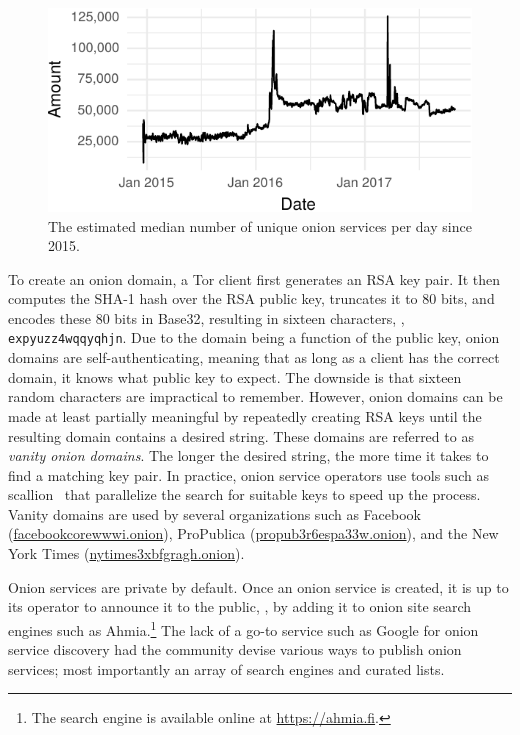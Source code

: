 \begin{figure}[ht]
\includegraphics[width=\linewidth]{figures/os-growth.pdf}
\caption{The estimated median number of unique onion services per day since
2015.}
\label{fig:os-growth}
\end{figure}

To create an onion domain, a Tor client first generates an RSA key pair.  It
then computes the SHA-1 hash over the RSA public key, truncates it to 80 bits,
and encodes these 80 bits in Base32, resulting in sixteen characters, \eg,
\texttt{expyuzz4wqqyqhjn}.  Due to the domain being a function of the public
key, onion domains are self-authenticating, meaning that as long as a client has
the correct domain, it knows what public key to expect.  The downside is that
sixteen random characters are impractical to remember.  However, onion domains
can be made at least partially meaningful by repeatedly creating RSA keys until
the resulting domain contains a desired string.  These domains are referred to
as \emph{vanity onion domains}.  The longer the desired string, the more time it
takes to find a matching key pair.  In practice, onion service operators use
tools such as scallion~\cite{scallion} that parallelize the search for suitable
keys to speed up the process.  Vanity domains are used by several organizations
such as Facebook (\url{facebookcorewwwi.onion}), ProPublica
(\url{propub3r6espa33w.onion}), and the New York Times
(\url{nytimes3xbfgragh.onion}).

Onion services are private by default.  Once an onion service is created, it is
up to its operator to announce it to the public, \eg, by adding it to onion site
search engines such as Ahmia.\footnote{The search engine is available online at
\url{https://ahmia.fi}.}  The lack of a go-to service such as Google for onion
service discovery had the community devise various ways to publish onion
services; most importantly an array of search engines and curated lists.
